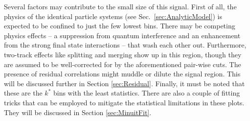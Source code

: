 Several factors may contribute to the small size of this signal.  
First of all, the physics of the identical particle systems (see Sec.\ \ref{sec:AnalyticModel}) is expected to be confined to just the few lowest bins.  
There may be competing physics effects -- a suppression from quantum interference and an enhancement from the strong final state interactions -- that wash each other out.  
Furthermore, two-track effects like splitting and merging show up in this region, though they are assumed to be well-corrected for by the aforementioned pair-wise cuts.  
The presence of residual correlations might muddle or dilute the signal region.  
This will be discussed further in Section \ref{sec:Residual}.  
Finally, it must be noted that these are the $k^*$ bins with the least statistics.  
There are also a couple of fitting tricks that can be employed to mitigate the statistical limitations in these plots.  
They will be discussed in Section \ref{sec:MinuitFit}.






